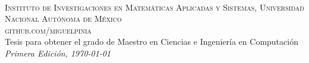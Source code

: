 ~\vfill
\thispagestyle{empty}

\noindent \textsc{Instituto de Investigaciones en Matemáticas
  Aplicadas y Sistemas, Universidad Nacional Autónoma de México}\\

\noindent \textsc{github.com/miguelpinia}\\

\noindent Tesis para obtener el grado de Maestro en Ciencias e
Ingeniería en Computación\\
\noindent \textit{Primera Edición, \today}

